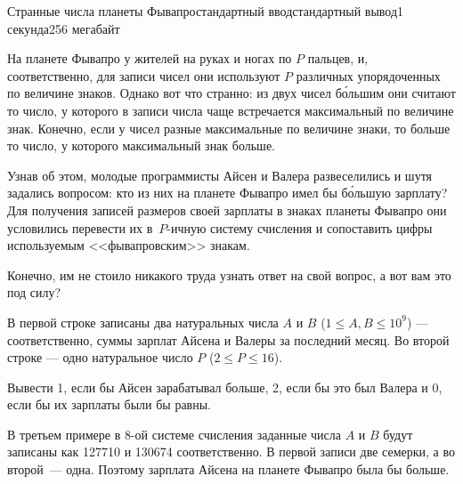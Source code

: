 \begin{problem}{Странные числа планеты Фывапро}{стандартный ввод}{стандартный вывод}{1 секунда}{256 мегабайт}

На планете Фывапро у жителей на руках и ногах по $P$ пальцев, и, соответственно, для записи чисел они используют $P$ различных упорядоченных по величине знаков. Однако вот что странно: из двух чисел б\'{о}льшим они считают то число, у которого в записи числа чаще встречается максимальный по величине знак. Конечно, если у чисел разные максимальные по величине знаки, то больше то число, у которого максимальный знак больше. 

Узнав об этом, молодые программисты Айсен и Валера развеселились и шутя задались вопросом: кто из них на планете Фывапро имел бы б\'{о}льшую зарплату? Для получения  записей размеров своей зарплаты в знаках планеты Фывапро они условились перевести их в~$P$-ичную систему счисления и сопоставить цифры используемым <<фывапровским>> знакам. 

Конечно, им не стоило никакого труда узнать ответ на свой вопрос, а вот вам это под силу?  

\InputFile
В первой строке записаны два натуральных числа $A$ и $B$ ($1 \le A, B \le 10^9$) ---  соответственно, суммы зарплат Айсена и Валеры за последний месяц. Во второй строке --- одно натуральное число $P$ ($2 \le P \le 16$).

\OutputFile
Вывести 1, если бы Айсен зарабатывал больше, 2, если бы это был Валера и 0, если бы их зарплаты были бы равны. 

\Examples

\begin{example}
%
%
%
\end{example}

\Explanation
В третьем примере в 8-ой системе счисления заданные числа $A$ и $B$ будут записаны как 127710 и 130674 соответственно. В первой записи две семерки, а во второй~--- одна. Поэтому зарплата Айсена на планете Фывапро была бы больше.

\end{problem}

